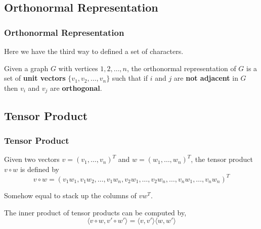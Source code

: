 \subsection{Orthonormal Representation}

      \begin{frame}
            \frametitle{Orthonormal Representation}

            Here we have the third way to defined a set of characters.

            \begin{definition}\label{def:orthonormalRepresentation}
                  Given a graph $ G $ with vertices $ 1,2,\dots,n $, the orthonormal representation of $ G $ is a set of \textbf{unit vectors} $ \{v_1, v_2, \dots, v_n\} $ such that if $ i $ and $ j $ are \textbf{not adjacent} in $ G $ then $ v_i $ and $ v_j $ are \textbf{orthogonal}.
            \end{definition}

            \pause


      \end{frame}

\subsection{Tensor Product}

      \begin{frame}
            \frametitle{Tensor Product}
            \begin{definition}\label{def:tensorProduct}
                  Given two vectors $ v = \left(v_{1},\dots,v_{n}\right)^{T} $ and $ w = \left(w_{1},\dots,w_{n}\right)^{T} $, the tensor product $ v \circ w $ is defined by
                  \begin{equation}
                        v \circ w = \left(
                              v_{1}w_{1}, v_{1}w_{2},\dots,v_{1}w_{n},
                              v_{2}w_{1},\dots,v_{2}w_{n},
                              \dots,
                              v_{n}w_{1},\dots,v_{n}w_{n}
                              \right)^{T}
                  \end{equation}

                  Somehow equal to stack up the columns of $ v w^{T} $.
            \end{definition}

            \pause

            \begin{lemma}
                  The inner product of tensor products can be computed by,
                  \begin{equation}
                        \langle v \circ w, v' \circ w' \rangle = \langle v, v' \rangle \langle w, w' \rangle
                  \end{equation}
            \end{lemma}

      \end{frame}

